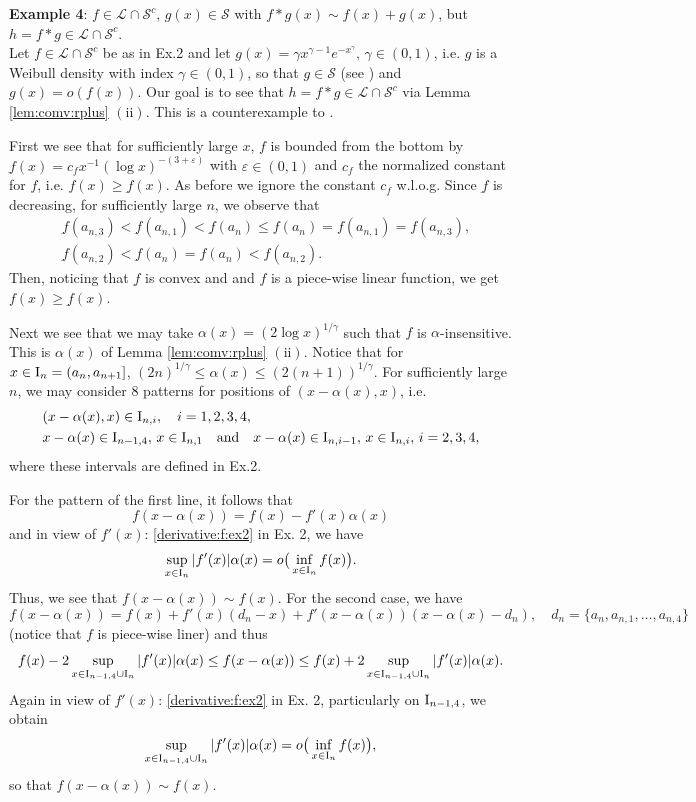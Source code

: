 \documentclass[12pt,leqno]{amsart}
\newcommand{\rI}{{\rm I}}
\newcommand{\vep}{\varepsilon}
\newcommand{\cals}{{\mathcal S}}
\newcommand{\call}{{\mathcal L}}
\newcommand{\1}{{\mathbf 1}}
\begin{document}
\noindent
{\bf Example 4}:  
$f \in \call \cap \cals^c $, $g(x)\in \cals$ with $f\ast g(x)\sim f(x)+g(x)$, but $h=f\ast g \in \call\cap \cals^c$. \\
Let $f \in \call \cap \cals^c$ be as in Ex.2 and let $g(x)=\gamma x^{\gamma-1} e^{-x^\gamma},\,\gamma\in(0,1)$, i.e. 
$g$ is a Weibull density with index $\gamma \in (0,1)$, so that $g \in \cals$ (see \cite[p.86]{Foss:Korshunov:Zachary:2013}) and 
$g(x)=o(f(x))$. Our goal is to see that $h=f\ast g \in \call\cap \cals^c$ via Lemma \ref{lem:comv:rplus} $(\mathrm{ii})$. 
This is a counterexample to \cite[Lemma 2]{Kluppelberg:Villasenor:1991}.

First we see that for sufficiently large $x$, $f$ is bounded from the bottom by 
$\underbar{f}(x)=c_f x^{-1}(\log x)^{-(3+\vep)}$ with $\vep\in (0,1)$ and $c_f$ the normalized constant for $f$, i.e. 
$f(x)\ge \underbar{f}(x)$.  
As before we ignore the constant $c_f$ w.l.o.g. Since $\underbar{f}$ is decreasing,  
for sufficiently large $n$, we observe that 
\begin{align*}
& \underbar{f}(a_{n,3}) < \underbar{f}(a_{n,1}) <\underbar{f}(a_{n}) \le 
f(a_{n})= f(a_{n,1})= f(a_{n,3}), \\
& \underbar{f}(a_{n,2}) < \underbar{f}(a_n)= f(a_n) < f(a_{n,2}). 
\end{align*}
Then, noticing that $\underbar{f}$ is convex and and $f$ is a piece-wise linear function, 
we get $f(x)\ge \underbar{f}(x)$. 

Next we see that we may take $\alpha(x)=(2\log x)^{1/\gamma}$ such that 
$f$ is $\alpha$-insensitive. This is $\alpha(x)$ of Lemma \ref{lem:comv:rplus} $(\mathrm{ii})$. 
Notice that for $x \in \rI_n=(a_n,a_{n+1}]$, $(2n)^{1/\gamma}\le \alpha(x)\le (2(n+1))^{1/\gamma}$. 
For sufficiently large $n$, we may consider $8$ patterns for positions of $(x-\alpha(x),x)$, i.e. 
\begin{align*}
& (x-\alpha(x),x) \in \rI_{n,i},\quad i=1,2,3,4, \\
& x-\alpha(x)\in \rI_{n-1,4},\,x\in \rI_{n,1}\quad \text{and}\quad x-\alpha(x)\in \rI_{n,i-1},\,x \in \rI_{n,i},\,i=2,3,4, 
\end{align*}
where these intervals are defined in Ex.2. 

For the pattern of the first line, it follows that 
\[
 f(x-\alpha(x)) = f(x)-f'(x) \alpha(x)
\]
and in view of $f'(x)$: \eqref{derivative:f:ex2} in Ex. 2, we have 
\[
 \sup_{x\in \rI_{n}}|f'(x)| \alpha(x) =o\big(
\inf_{x\in \rI_{n}}f(x)
\big).
\]
Thus, we see that $f(x-\alpha(x))\sim f(x)$. 
For the second case, we have  
\[
 f(x-\alpha(x)) = f(x)+f'(x)(d_n-x)+f'(x-\alpha(x))(x-\alpha(x)-d_n),\quad d_n=\{a_n,a_{n,1},\ldots,a_{n,4}\}
\]
(notice that $f$ is piece-wise liner) and thus 
\[
 f(x)-2\sup_{x\in \rI_{n-1,4}\cup\rI_{n}}|f'(x)|\alpha(x) \le f(x-\alpha(x)) \le f(x) + 2\sup_{x\in \rI_{n-1,4}\cup\rI_{n}} |f'(x)|\alpha(x) .
\]
Again in view of $f'(x)$: \eqref{derivative:f:ex2} in Ex. 2, particularly on $\rI_{n-1,4}$, we obtain 
\[
 \sup_{x\in \rI_{n-1,4}\cup \rI_n}|f'(x)| \alpha(x) =o\big(
\inf_{x\in \rI_{n}}f(x)
\big),
\]
so that $f(x-\alpha(x))\sim f(x)$. 
\end{document}
